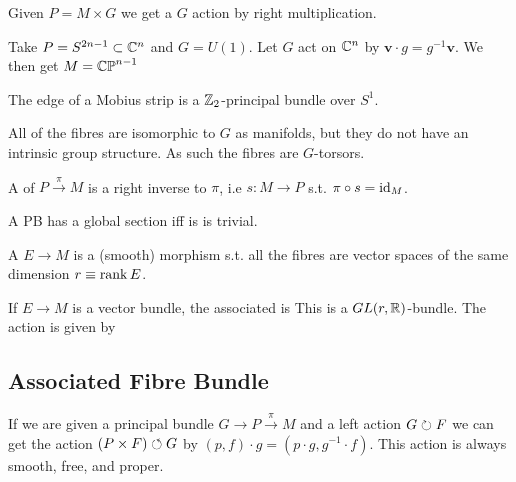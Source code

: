 \documentclass{article}
\begin{document}
\begin{example}
Given $P=M \times G$ we get a $G$ action by right multiplication. 
\end{example}

\begin{example}
Take $P = S^{2n-1} \subset \mathbb{C}^n$ and $G = U(1)$. Let $G$ act on $\mathbb{C}^n$ by $\bm{v} \cdot g = g^{-1} \bm{v}$. We then get $M = \mathbb{CP}^{n-1}$
\end{example}

\begin{example}
The edge of a Mobius strip is a $\mathbb{Z}_2$-principal bundle over $S^1$.
\end{example}

\begin{remark}
All of the fibres are isomorphic to $G$ as manifolds, but they do not have an intrinsic group structure. As such the fibres are $G$-torsors. 
\end{remark}

\begin{definition}
A  of $P \overset{\pi}{\to}M$ is a right inverse to $\pi$, i.e $s:M \to P$ s.t. $\pi \circ s = \operatorname{id}_M$. 
\end{definition}

\begin{lemma}
A PB has a global section iff is is trivial. 
\end{lemma}



\begin{definition}
A  $E \to M$ is a (smooth) morphism s.t. all the fibres are vector spaces of the same dimension $r\equiv\operatorname{rank} E$. 
\end{definition}

\begin{definition}
If $E \to M$ is a vector bundle, the associated  is 
This is a $GL(r,\mathbb{R})$-bundle. The action is given by 
\end{definition}

\subsection{Associated Fibre Bundle}
If we are given a principal bundle $G \to P \overset{\pi}{\to} M$ and a left action $G \circlearrowright F$ we can get the action $(P \times F) \circlearrowleft G$ by $(p,f) \cdot g = (p\cdot g, g^{-1} \cdot f)$. This action is always smooth, free, and proper. 
\end{document}
